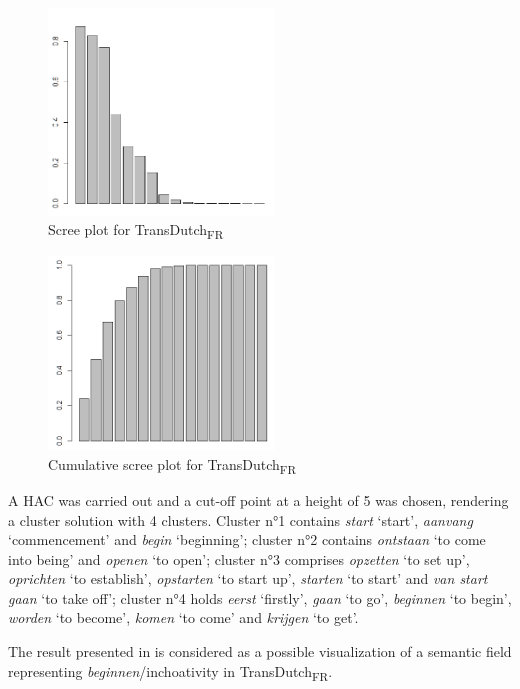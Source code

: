 \begin{figure}
\includegraphics[width=6cm]{figures/Vandevoorde2-img76.png}
\caption{\label{fig:4:74}Scree plot for TransDutch\textsubscript{FR}}
\end{figure}

\begin{figure}
\includegraphics[width=6cm]{figures/Vandevoorde2-img77.png}
\caption{\label{fig:4:75}Cumulative scree plot for TransDutch\textsubscript{FR}}
\end{figure} 

A HAC was carried out and a cut-off point at a height of 5 was chosen, rendering a cluster solution with 4 clusters. Cluster n°1 contains \textit{start} `start', \textit{aanvang} `commencement' and \textit{begin} `beginning'; cluster n°2 contains \textit{ontstaan} `to come into being' and \textit{openen} `to open'; cluster n°3 comprises \textit{opzetten} `to set up', \textit{oprichten} `to establish', \textit{opstarten} `to start up', \textit{starten} `to start' and \textit{van start gaan} `to take off'; cluster n°4 holds \textit{eerst} `firstly', \textit{gaan} `to go', \textit{beginnen} `to begin', \textit{worden} `to become', \textit{komen} `to come' and \textit{krijgen} `to get'.

The result presented in  is considered as a possible visualization of a semantic field representing \textit{beginnen}/inchoativity in TransDutch\textsubscript{FR}.

